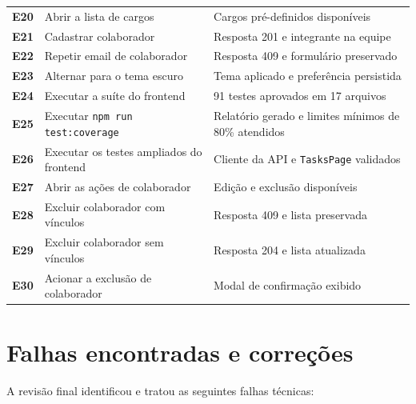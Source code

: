 \documentclass[12pt,a4paper,openany]{report}
\begin{document}
\begin{longtable}{>{\bfseries}p{} p{} p{}}
E20 & Abrir a lista de cargos & Cargos pré-definidos disponíveis \\
E21 & Cadastrar colaborador & Resposta 201 e integrante na equipe \\
E22 & Repetir email de colaborador & Resposta 409 e formulário preservado \\
E23 & Alternar para o tema escuro & Tema aplicado e preferência persistida \\
E24 & Executar a suíte do frontend & 91 testes aprovados em 17 arquivos \\
E25 & Executar \texttt{npm run test:coverage} & Relatório gerado e limites mínimos de 80\% atendidos \\
E26 & Executar os testes ampliados do frontend & Cliente da API e \texttt{TasksPage} validados \\
E27 & Abrir as ações de colaborador & Edição e exclusão disponíveis \\
E28 & Excluir colaborador com vínculos & Resposta 409 e lista preservada \\
E29 & Excluir colaborador sem vínculos & Resposta 204 e lista atualizada \\
E30 & Acionar a exclusão de colaborador & Modal de confirmação exibido \\
\bottomrule
\end{longtable}

\section{Falhas encontradas e correções}

A revisão final identificou e tratou as seguintes falhas técnicas:
\end{document}
